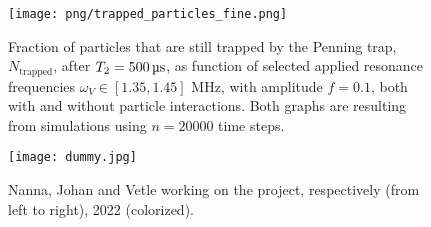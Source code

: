 \begin{figure}
    \texttt{[image: png/trapped\_particles\_fine.png]}
    \caption{Fraction of particles that are still trapped by the Penning trap, $N_\mathrm{trapped}$, after $T_2=500\,\mus$, as function of selected applied resonance frequencies $\omega_V\in[1.35,1.45]$ MHz, with amplitude $f=0.1$, both with and without particle interactions. Both graphs are resulting from simulations using $n=20000$ time steps.}
    \label{fig:trapped_with}
\end{figure}



\begin{figure}
    \texttt{[image: dummy.jpg]}
    \caption{Nanna, Johan and Vetle working on the project, respectively (from left to right), 2022 (colorized).}
    \label{fig:some_ref} 
\end{figure} 




 






